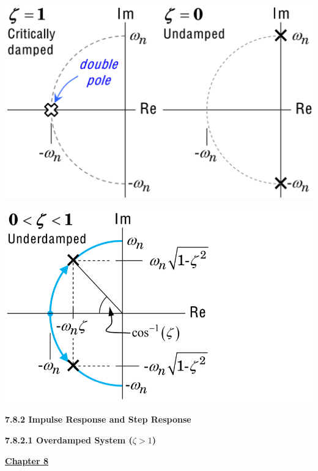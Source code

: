 \documentclass[landscape,a4paper]{extarticle}
\newenvironment{Figure}
  {\par\medskip\noindent\minipage{\linewidth}}
  {\endminipage\par\medskip}
\begin{document}
\begin{multicols*}{5}
\begin{itemize}
\begin{Figure}
        \end{Figure}
        \begin{Figure}
            \centering
            \includegraphics[width=\linewidth]{criticallyDamped_undamped.png}                
        \end{Figure}
        \begin{Figure}
            \centering
            \includegraphics[width=\linewidth]{underdamped.png}                
        \end{Figure}
    \end{itemize}

    \textbf{7.8.2 Impulse Response and Step Response}
    
    \textbf{7.8.2.1 Overdamped System ($\zeta > 1$)}


    \textbf{\uline{Chapter 8}}


\end{multicols*}
\end{document}
